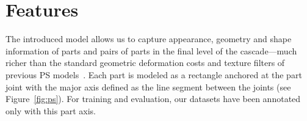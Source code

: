 \chapter{Features}\label{sec:features}



The introduced \CPS model allows us to capture appearance, geometry and shape information of parts and pairs of parts in the final level of the cascade---much richer than the standard geometric deformation costs and texture filters of previous PS models~\cite{felz05,devacrf,ferrari08,andriluka09}.  
Each part is modeled as a rectangle anchored at the part joint with the major axis defined as the line segment between the joints (see Figure~\ref{fig:ps}).  For training and evaluation, our datasets have been annotated only with this part axis.



